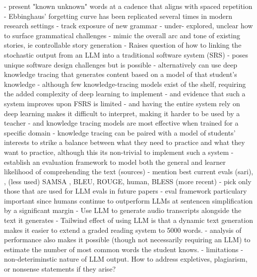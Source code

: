 \documentclass[
	letterpaper, %
]{jdf}
\begin{document}
    - present "known unknown" words at a cadence that aligns with spaced repetition
      - Ebbinghaus' forgetting curve has been replicated several times in modern research settings \cite{Murre2015ReplicationAA}
    - track exposure of new grammar
      - under- explored, unclear how to surface grammatical challenges
    - mimic the overall arc and tone of existing stories, ie controllable story generation \cite{controllable_story_generation}
  - Raises question of how to linking the stochastic output from an LLM into a traditional software system (SRS)
    - poses unique software design challenges but is possible \cite{taiwan_adaptive_testing}
    - alternatively can use deep knowledge tracing \cite{deep_knowledge_tracing} that generates content based on a model of that student's knowledge
      - although few knowledge-tracing models exist of the shelf, requiring the added complexity of deep learning to implement \cite{question_generation_adaptive_education, generative_information_retrieval}
        - and evidence that such a system improves upon FSRS is limited \cite{flashcard_scheduler_evolution}
        - and having the entire system rely on deep learning makes it difficult to interpret, making it harder to be used by a teacher \cite{deep_learning_knowledge_tracing}
        - and knowledge tracing models are most effective when trained for a specific domain \cite{dkt_knowledge_tracing}
      - knowledge tracing can be paired with a model of students' interests to strike a balance between what they need to practice and what they want to practice, although this its non-trivial to implement such a system \cite{llm_augmented_exercise_retrieval}
  - establish an evaluation framework to model both the general and learner likelihood of comprehending the text (sources)
    - mention best current evals (sari), \cite{xu-etal-2016-optimizing}, (less used) SAMSA \cite{sulem-etal-2018-semantic}, BLEU, ROUGE, human, BLESS (more recent) \cite{kew2023bless}
      - pick only those that are used for LLM evals in future papers
      - eval framework particulary important since humans continue to outperform LLMs at sentencen simplification by a significant margin\cite{kew2023bless}
  - Use LLM to generate audio transcripts alongside the text it generates \cite{Chang2015ImprovingRR}
  - Tailwind effect of using LLM is that a dynamic text generation makes it easier to extend a graded reading system to 5000 words.
    - analysis of performance also makes it possible (though not necessarily requiring an LLM) to estimate the number of most common words the student knows.
  - limitations
    - non-deteriminstic nature of LLM output. How to address expletives, plagiarism, or nonsense statements if they arise? \cite{recent_story_generation_review}


\printbibliography{}
\end{document}
